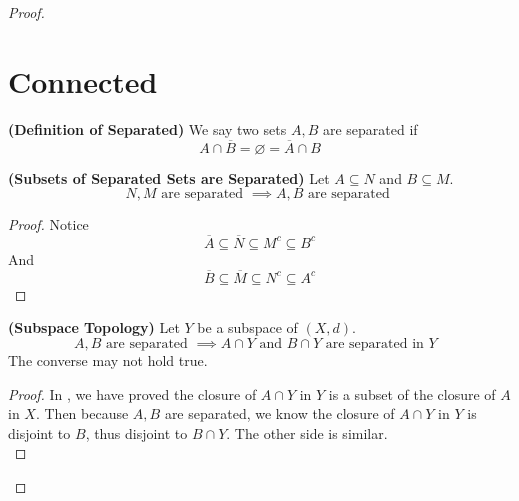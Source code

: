 \documentclass{report}
\begin{document}
\begin{proof}
\section{Connected}
\begin{definition}
\label{6.4.1}
\textbf{(Definition of Separated)} We say two sets $A,B$ are separated if 
 \begin{equation}
A\cap \overline{B}=\varnothing=\overline{A}\cap B
\end{equation}
\end{definition}
\begin{theorem}
\label{6.4.2}
\textbf{(Subsets of Separated Sets are Separated)} Let $A\subseteq N$ and $B\subseteq M$.  
\begin{equation}
N,M\text{ are separated }\implies A,B\text{ are separated }
\end{equation}
\end{theorem}
\begin{proof}
Notice
\begin{equation}
\overline{A}\subseteq \overline{N}\subseteq M^c\subseteq B^c
\end{equation}
And
\begin{equation}
\overline{B}\subseteq \overline{M} \subseteq N^c \subseteq A^c
\end{equation}
\end{proof}
\begin{theorem}
\label{3.4.3}
\textbf{(Subspace Topology)} Let $Y$ be a subspace of $(X,d)$.
\begin{equation}
A,B\text{ are separated }\implies A\cap Y\text{ and }B\cap Y\text{ are separated in $Y$ }
\end{equation}
The converse may not hold true.
\end{theorem}
\begin{proof}
In , we have proved the closure of $A\cap Y$ in $Y$ is a subset of the closure of  $A$ in $X$. Then because $A,B$ are separated, we know the closure of  $A\cap Y$ in $Y$ is disjoint to  $B$, thus disjoint to $B\cap Y$. The other side is similar.\\


\end{proof}
\end{proof}
\end{document}
